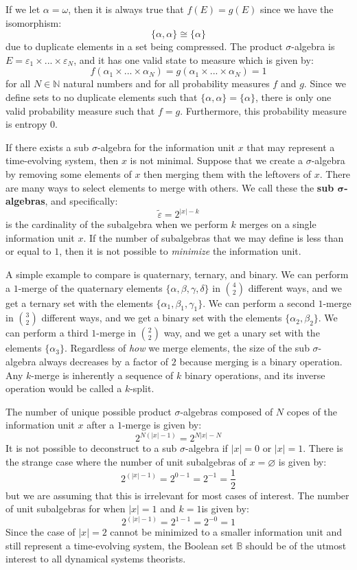 \documentclass[10pt, a5paper, twoside, openright]{memoir}
\begin{document}
If we let $\alpha = \omega$, then it is always true that $f(E) = g(E)$ since we have the isomorphism: 
$$\{\alpha, \alpha \} \cong \{ \alpha \}$$
due to duplicate elements in a set being compressed. The product $\sigma$-algebra is $E = \varepsilon_1 \times ...\times \varepsilon_N$, and it has one valid state to measure which is given by:
$$f(\alpha_1 \times ... \times \alpha_N) = g(\alpha_1 \times ... \times \alpha_N) = 1$$
for all $N \in \mathbb N$ natural numbers and for all probability measures $f$ and $g$. Since we define sets to no duplicate elements such that $\{\alpha, \alpha\} = \{ \alpha \}$, there is only one valid probability measure such that $f = g$. Furthermore, this probability measure is entropy $0$.

If there exists a sub $\sigma$-algebra for the information unit $x$ that may represent a time-evolving system, then $x$ is not minimal. Suppose that we create a $\sigma$-algebra by removing some elements of $x$ then merging them with the leftovers of $x$. There are many ways to select elements to merge with others. We call these the \textbf{sub $\boldsymbol \sigma$-algebras}, and specifically:
$$\tilde \varepsilon = 2^{|x| - k}$$ 
is the cardinality of the subalgebra when we perform $k$ merges on a single information unit $x$. If the number of subalgebras that we may define is less than or equal to $1$, then it is not possible to \textit{minimize} the information unit. 

A simple example to compare is quaternary, ternary, and binary. We can perform a $1$-merge of the quaternary elements $\{ \alpha, \beta, \gamma, \delta \}$ in ${4 \choose 2}$ different ways, and we get a ternary set with the elements $\{ \alpha_1, \beta_1, \gamma_1 \}$. We can perform a second $1$-merge in ${3 \choose 2}$ different ways, and we get a binary set with the elements $\{ \alpha_2, \beta_2\}$. We can perform a third $1$-merge in ${2 \choose 2}$ way, and we get a unary set with the elements $\{ \alpha_3\}$. Regardless of \textit{how} we merge elements, the size of the sub $\sigma$-algebra always decreases by a factor of $2$ because merging is a binary operation. Any $k$-merge is inherently a sequence of $k$ binary operations, and its inverse operation would be called a $k$-split.

The number of unique possible product $\sigma$-algebras composed of $N$ copes of the information unit $x$ after a $1$-merge is given by:
$$2^{N(|x| - 1)} = 2^{N|x| - N}$$
It is not possible to deconstruct to a sub $\sigma$-algebra if $|x| = 0$ or $|x| = 1$. There is the strange case where the number of unit subalgebras of $x = \varnothing$ is given by:
$$2^{(|x| - 1)} = 2^{0 - 1} = 2^{-1} = \frac{1}{2}$$
but we are assuming that this is irrelevant for most cases of interest. The number of unit subalgebras for when $|x| = 1$ and $k=1$is given by:
$$2^{(|x| - 1)} = 2^{1 - 1} = 2^{-0} = 1$$
Since the case of $|x| = 2$ cannot be minimized to a smaller information unit and still represent a time-evolving system, the Boolean set $\mathbb B$ should be of the utmost interest to all dynamical systems theorists. 
\end{document}
